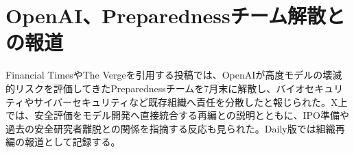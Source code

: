 \section{OpenAI、Preparednessチーム解散との報道}
Financial TimesやThe Vergeを引用する投稿では、OpenAIが高度モデルの壊滅的リスクを評価してきたPreparednessチームを7月末に解散し、バイオセキュリティやサイバーセキュリティなど既存組織へ責任を分散したと報じられた。X上では、安全評価をモデル開発へ直接統合する再編との説明とともに、IPO準備や過去の安全研究者離脱との関係を指摘する反応も見られた。Daily版では組織再編の報道として記録する。
